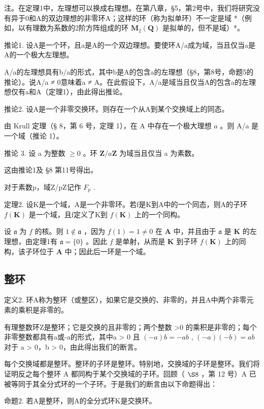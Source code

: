注。在定理1中，左理想可以换成右理想。在第八章，§5，第2号中，我们将研究没有异于0和A的双边理想的非零环A；这样的环（称为拟单环）不一定是域 *（例如，以有理数为系数的2阶方阵组成的环 \(\mathbf{M}_2(\mathbf{Q})\) 是拟单的，但不是域）*。

推论1. 设A是一个环，且a是A的一个双边理想。要使环A/a成为域，当且仅当a是A的一个极大左理想。

A/a的左理想具有b/a的形式，其中b是A的包含a的左理想（§8，第8号，命题5的推论）。说A/a ≠ 0意味着a ≠ A。在此假设下，A/a是域当且仅当A的包含a的左理想仅有a和A（定理1），由此得出推论。

推论2. 设A是一个非零交换环。则存在一个从A到某个交换域上的同态。

由 Krull 定理（§ 8，第 6 号，定理 1），在 A 中存在一个极大理想 \(a\) 。则 A/a 是一个域（推论 1）。

推论 3. 设 a 为整数 \(\geqslant 0\) 。环 \(\mathbf{Z} / a\mathbf{Z}\) 为域当且仅当 a 为素数。

这由推论1及 §8 第11号得出。

对于素数p，域Z/pZ记作 \(F_{p}\) .

定理2. 设K是一个域，A是一个非零环。若f是K到A中的一个同态，则A的子环 \(f(\mathbf{K})\) 是一个域，且f定义了K到 \(f(\mathbf{K})\) 上的一个同构。

设 \(\mathfrak{a}\) 为 \(f\) 的核。则 \(1 \notin \mathfrak{a}\) ，因为 \(f(1) = 1 \neq 0\) 在 \(\mathbf{A}\) 中，并且由于 \(\mathfrak{a}\) 是 \(\mathbf{K}\) 的左理想，由定理1有 \(\mathfrak{a} = \{0\}\) 。因此 \(f\) 是单射，从而是 \(\mathbf{K}\) 到子环 \(f(\mathbf{K})\) 上的同构，该子环位于 \(\mathbf{A}\) 中；因此后一环是一个域。

\subsection{整环}

定义2. 环A称为整环（或整区），如果它是交换的、非零的，并且A中两个非零元素的乘积是非零的。

有理整数环Z是整环；它是交换的且非零的；两个整数 \textgreater0 的乘积是非零的；每个非零整数都具有a或-a的形式，其中a \textgreater{} 0 且 \((-a)b = -ab\) , \((-a)(-b) = ab\) 对于 a \textgreater{} 0，b \textgreater{} 0，由此得出我们的断言。

每个交换域都是整环。整环的子环是整环。特别地，交换域的子环是整环。我们将证明反之每个整环 A 都同构于某个交换域的子环。回顾（ \(\S 8\) ，第 12 号）A 已被等同于其全分式环的一个子环。于是我们的断言由以下命题得出：

命题2. 若A是整环，则A的全分式环K是交换环。

